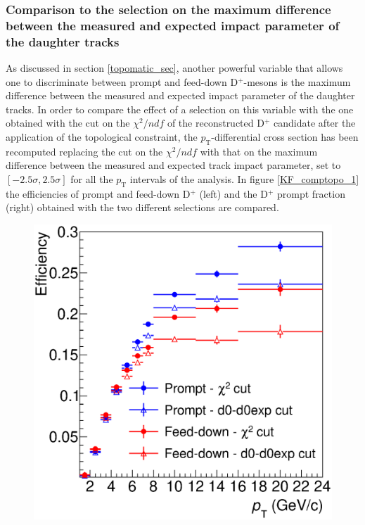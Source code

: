 \documentclass[b5paper,10pt,twoside,oldstyle,classica]{toptesi}
\newcommand{\pt}{p_\text{T}}
\begin{document}
\subsubsection{Comparison to the selection on the maximum difference between the measured and expected impact parameter of the daughter tracks} 
As discussed in section \ref{topomatic_sec}, another powerful variable that allows one to discriminate between prompt and feed-down D$^+$-mesons is the maximum difference between the measured and expected impact parameter of the daughter tracks. In order to compare the effect of a selection on this variable with the one obtained with the cut on the $\chi^2/ndf$ of the reconstructed D$^+$ candidate after the application of the topological constraint, the $\pt$-differential cross section has been recomputed replacing the cut on the $\chi^2/ndf$ with that on the maximum difference between the measured and expected track impact parameter, set to $[-2.5\sigma,2.5\sigma]$ for all the $\pt$ intervals of the analysis. In figure \ref{KF_comptopo_1} the efficiencies of prompt and feed-down D$^+$ (left) and the D$^+$ prompt fraction (right) obtained with the two different selections are compared. \begin{figure}[tb]
\begin{center}
{\includegraphics[scale = 0.31]{Eff_cutset1_cutsettopo.eps}}
\hspace{-0.2cm}

\end{center}
\end{figure}
\end{document}
